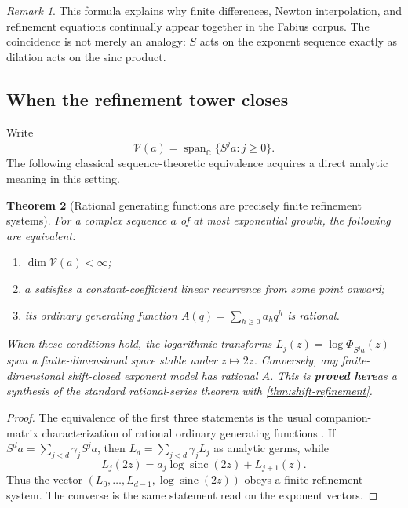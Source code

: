 \documentclass[11pt,oneside]{article}
\numberwithin{equation}{section}
\newtheorem{theorem}{Theorem}[section]
\theoremstyle{definition}
\theoremstyle{remark}
\newtheorem{remark}[theorem]{Remark}
\newcommand{\C}{\mathbb C}
\newcommand{\sinc}{\operatorname{sinc}}
\newcommand{\statusproved}{\textcolor{deepgreen}{\textbf{proved here}}}
\begin{document}
\begin{remark}
This formula explains why finite differences, Newton interpolation, and refinement equations
continually appear together in the Fabius corpus.  The coincidence is not merely an analogy:
$S$ acts on the exponent sequence exactly as dilation acts on the sinc product.
\end{remark}

\subsection{When the refinement tower closes}

Write
\[
 \mathscr V(a)=\operatorname{span}_{\C}\{S^ja:j\ge0\}.
\]
The following classical sequence-theoretic equivalence acquires a direct analytic meaning in
this setting.

\begin{theorem}[Rational generating functions are precisely finite refinement systems]
\label{thm:rational-classification}
For a complex sequence $a$ of at most exponential growth, the following are equivalent:
\begin{enumerate}
\item $\dim\mathscr V(a)<\infty$;
\item $a$ satisfies a constant-coefficient linear recurrence from some point onward;
\item its ordinary generating function $A(q)=\sum_{h\ge0}a_hq^h$ is rational.
\end{enumerate}
When these conditions hold, the logarithmic transforms
$L_j(z)=\log\Phi_{S^ja}(z)$ span a finite-dimensional space stable under $z\mapsto2z$.
Conversely, any finite-dimensional shift-closed exponent model has rational $A$.
This is \statusproved as a synthesis of the standard rational-series theorem with
\cref{thm:shift-refinement}.
\end{theorem}

\begin{proof}
The equivalence of the first three statements is the usual companion-matrix characterization
of rational ordinary generating functions \cite{stanley1997}.  If
$S^da=\sum_{j<d}\gamma_jS^ja$, then
$L_d=\sum_{j<d}\gamma_jL_j$ as analytic germs, while
\[
 L_j(2z)=a_j\log\sinc(2z)+L_{j+1}(z).
\]
Thus the vector $(L_0,\ldots,L_{d-1},\log\sinc(2z))$ obeys a finite refinement system.
The converse is the same statement read on the exponent vectors.
\end{proof}
\end{document}
